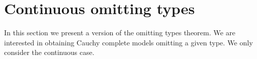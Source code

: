 \documentclass{amsproc}
\begin{document}
{\begin{comment}
  Let $a\models\{\gamma_i(z):i<\omega\}$.
  We claim that that $A,a$ does not p/c-isolate $p(x)$.
  Otherwise, by Fact~\ref{fact_isolation}, $\neg\xi_i(x,a)\rightarrow p(x)$ for some consistent $\neg\xi_i(x,a)$.
  This contradicts $a\models\gamma_{i+1}(z)$.
  
  Therefore the proof is complete if we can show that it is always possible to find the formula $\varphi(x)$ required in (2).
  
  Suppose for a contradiction that $\neg\xi_i(x,z)\wedge\gamma_i(z)$ is consistent while (\#) is inconsistent for all formulas $\varphi(x)\in p$.
  This immediately implies that 
  
  \ceq{\hfill\exists z\;\big[\neg\xi_i(x,z)\wedge\neg\tilde{\gamma}(z)\big]}{\rightarrow}{p(x).}
  
  By Fact~\ref{fact_isolation}, $p(x)$ is p/c-isolated, a contradiction.
\end{proof}

From the lemma we easily obtain an omitting types theorem for positive types that is very close to the classical one.

\begin{theorem}[Positive Omitting Types]\label{thm_pOTT}
  Let ${\EuScript F}^{\rm p}$ be separable.
  Let $A$ be countable.
  Assume also that $p(x)\subseteq{\EuScript F}^{\rm p}(A)$ is not p-isolated.
  Then there is a p-model $M$ containing $A$ that omits $p(x)$. 
\end{theorem}

\begin{proof}
  As in the classical proof, appy the lemma above and the Tarski-Vaught test (Theorem~\ref{thm_Tarski_Vaught}) to obtain a countable p-model $M$ that does not isolate $p(x)$.
  For p-models, p-isolating a type is equivalent to  realizing it.
\end{proof}
\end{comment}

\section{Continuous omitting types}

\def\ceq#1#2#3{\parbox[t]{25ex}{$\displaystyle #1$}\parbox{6ex}{\hfil $#2$}{$\displaystyle #3$}}

In this section we present a version of the omitting types theorem.
We are interested in obtaining Cauchy complete models omitting a given type.
We only consider the continuous case.

}
\end{document}
